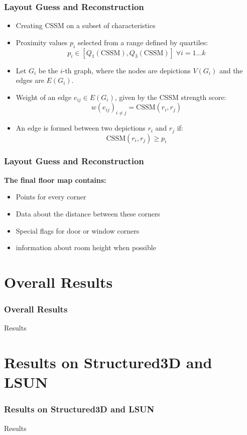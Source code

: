 \documentclass{beamer}
\begin{document}
\begin{frame}
\frametitle{Layout Guess and Reconstruction}

    \begin{itemize}
    \item Creating CSSM on a subset of characteristics
    \item Proximity values \( p_i \) selected from a range defined by quartiles:
    \[
     p_i \in [Q_1(\text{CSSM}), Q_3(\text{CSSM})] \; \forall i=1\dots k
    \]
    
    \item Let \( G_i \) be the \( i \)-th graph, where the nodes are depictions \( V(G_i) \) and the edges are \( E(G_i) \).
    \item Weight of an edge \( e_{ij} \in E(G_i) \), given by the CSSM strength score:
    \[
    w(e_{ij})_{i\ne j} = \text{CSSM}(r_i, r_j)
    \]
    \item An edge is formed between two depictions \( r_i \) and \( r_j \) if:
    \[
    \text{CSSM}(r_i, r_j) \geq p_i
    \]
    
\end{itemize}
\end{frame}

\begin{frame}
\frametitle{Layout Guess and Reconstruction}
\textbf{The final floor map contains:}
\begin{itemize}
    \item Points for every corner
    \item Data about the distance between these corners
    \item Special flags for door or window corners
    \item information about room height when possible
\end{itemize}
\end{frame}


\section{Overall Results}
\begin{frame}
\frametitle{Overall Results}
Results
\end{frame}

\section{Results on Structured3D and LSUN}
\begin{frame}
\frametitle{Results on Structured3D and LSUN}
Results
\end{frame}
\end{document}
